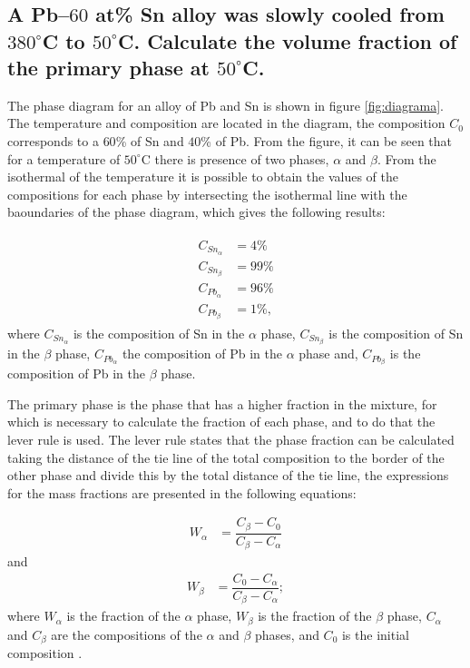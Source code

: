 \section{}

\subsection{A Pb–$60$ at\% Sn alloy was slowly cooled from $380^{\circ}$C to $50^{\circ}$C. Calculate the volume fraction of the primary phase at $50^{\circ}$C.}

The phase diagram for an alloy of Pb and Sn is shown in figure \ref{fig:diagrama}. The temperature and composition are located in the diagram, the composition $C_0$ corresponds to a $60$\% of Sn and $40$\% of Pb. From the figure, it can be seen that for a temperature of $50^{\circ}$C there is presence of two phases, $\alpha$ and $\beta$. From the isothermal of the temperature it is possible to obtain the values of the compositions for each phase by intersecting the isothermal line with the baoundaries of the phase diagram, which gives the following results:

\begin{align}
    \label{eq:compostitions}
    \begin{split}
        C_{Sn_{\alpha}}&=4\% \\ C_{Sn_{\beta}}&=99\% \\ C_{Pb_{\alpha}}&=96\% \\ C_{Pb_{\beta}}&=1\%,
    \end{split}
\end{align}
where $C_{Sn_{\alpha}}$ is the composition of Sn in the $\alpha$ phase, $C_{Sn_{\beta}}$ is the composition of Sn in the $\beta$ phase, $C_{Pb_{\alpha}}$ the composition of Pb in the $\alpha$ phase and, $C_{Pb_{\beta}}$ is the composition of Pb in the $\beta$ phase.

The primary phase is the phase that has a higher fraction in the mixture, for which is necessary to calculate the fraction of each phase, and to do that the lever rule is used. The lever rule states that the phase fraction can be calculated taking the distance of the tie line of the total composition to the border of the other phase and divide this by the total distance of the tie line, the expressions for the mass fractions are presented in the following equations:

\begin{align}
    \label{eq:frac_alpha}
    W_{\alpha}&=\dfrac{C_{\beta}-C_0}{C_{\beta}-C_{\alpha}}
\end{align}
and
\begin{align}
    \label{eq:frac_beta}
    W_{\beta}&=\dfrac{C_0-C_{\alpha}}{C_{\beta}-C_{\alpha}};
\end{align}
where $W_{\alpha}$ is the fraction of the $\alpha$ phase, $W_{\beta}$ is the fraction of the $\beta$ phase, $C_{\alpha}$ and $C_{\beta}$ are the compositions of the $\alpha$ and $\beta$ phases, and $C_0$ is the initial composition \citep[p.~290-291]{callister2010materials}. 

